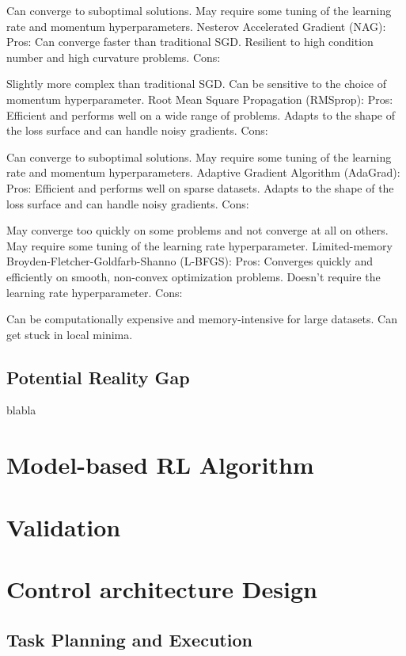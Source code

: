 Can converge to suboptimal solutions.
May require some tuning of the learning rate and momentum hyperparameters.
Nesterov Accelerated Gradient (NAG):
Pros:
Can converge faster than traditional SGD.
Resilient to high condition number and high curvature problems.
Cons:

Slightly more complex than traditional SGD.
Can be sensitive to the choice of momentum hyperparameter.
Root Mean Square Propagation (RMSprop):
Pros:
Efficient and performs well on a wide range of problems.
Adapts to the shape of the loss surface and can handle noisy gradients.
Cons:

Can converge to suboptimal solutions.
May require some tuning of the learning rate and momentum hyperparameters.
Adaptive Gradient Algorithm (AdaGrad):
Pros:
Efficient and performs well on sparse datasets.
Adapts to the shape of the loss surface and can handle noisy gradients.
Cons:

May converge too quickly on some problems and not converge at all on others.
May require some tuning of the learning rate hyperparameter.
Limited-memory Broyden-Fletcher-Goldfarb-Shanno (L-BFGS):
Pros:
Converges quickly and efficiently on smooth, non-convex optimization problems.
Doesn't require the learning rate hyperparameter.
Cons:

Can be computationally expensive and memory-intensive for large datasets.
Can get stuck in local minima.
\subsection{Potential Reality Gap}
blabla

\section{Model-based RL Algorithm}

\section{Validation}

\section{Control architecture Design}
\subsection{Task Planning and Execution}

